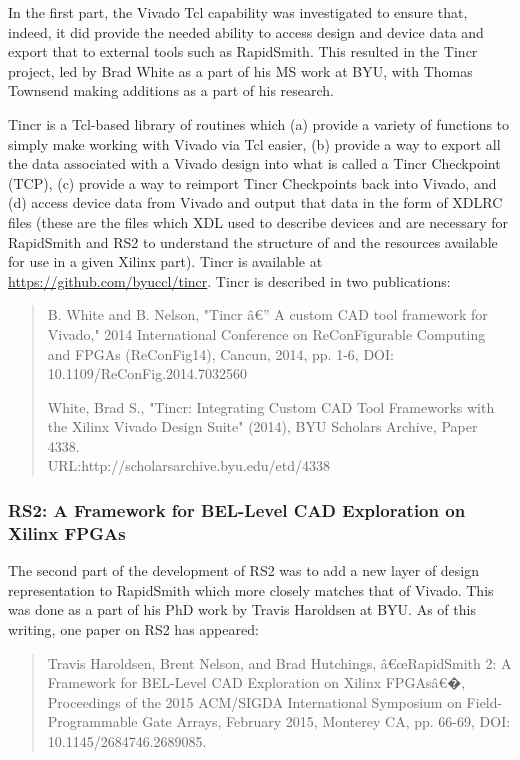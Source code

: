 \documentclass[10pt]{article}
\begin{document}
In the first part, the Vivado Tcl capability was investigated to ensure that,
indeed, it did provide the needed ability to access design and device data and
export that to external tools such as RapidSmith.  This resulted in the Tincr
project, led by Brad White as a part of his MS work at BYU, with Thomas
Townsend making additions as a part of his research.

Tincr is a Tcl-based library of routines which (a) provide a variety of
functions to simply make working with Vivado via Tcl easier, (b) provide a way
to export all the data associated with a Vivado design into what is called a
Tincr Checkpoint (TCP), (c) provide a way to reimport Tincr Checkpoints back
into Vivado, and (d) access device data from Vivado and output that data in the
form of XDLRC files (these are the files which XDL used to describe devices and
are necessary for RapidSmith and RS2 to understand the structure of and the
resources available for use in a given Xilinx part).  Tincr is available at 
\href{https://github.com/byuccl/tincr}{\color{blue}https://github.com/byuccl/tincr}.
Tincr is described in two publications:

\begin{quotation}B. White and B. Nelson, "Tincr â€” A custom CAD tool framework
for Vivado," 2014 International Conference on ReConFigurable Computing and FPGAs (ReConFig14),
Cancun, 2014, pp. 1-6, DOI: 10.1109/ReConFig.2014.7032560

White, Brad S., "Tincr: Integrating Custom CAD Tool Frameworks with
the Xilinx Vivado Design Suite" (2014), BYU Scholars Archive, Paper 4338. 
\\URL:http://scholarsarchive.byu.edu/etd/4338
\end{quotation}

\subsubsection{RS2: A Framework for BEL-Level CAD Exploration on Xilinx FPGAs}
The second part of the development of RS2 was to add a new layer of design
representation to RapidSmith which more closely matches that of Vivado.  This
was done as a part of his PhD work by Travis Haroldsen at BYU.  As of this
writing, one paper on RS2 has appeared:

\begin{quotation}Travis Haroldsen, Brent Nelson, and Brad Hutchings, â€œRapidSmith
2:
A Framework for BEL-Level CAD Exploration on Xilinx FPGAsâ€�, Proceedings of the
2015 ACM/SIGDA International Symposium on Field-Programmable Gate Arrays,
February 2015, Monterey CA, pp. 66-69, DOI: 10.1145/2684746.2689085.
\end{quotation}
\end{document}

